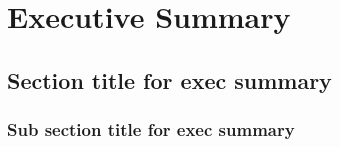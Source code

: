 \chapter*{Executive Summary}
\pagestyle{fancy}




\section*{Section title for exec summary}

\lipsum[1]

\subsection*{Sub section title for exec summary}

\lipsum[2-3]
